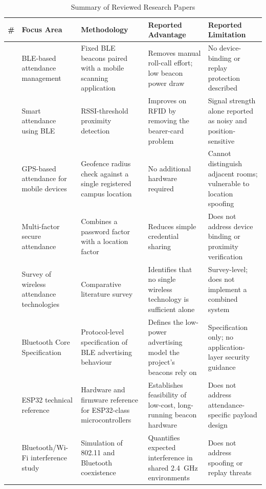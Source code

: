\documentclass[12pt, a4paper, oneside]{report}
\begin{document}
\begin{table}[p]
\centering
\caption{Summary of Reviewed Research Papers}
\label{tab:reviewed-papers}
\tiny
\setlength{\tabcolsep}{3pt}
\renewcommand{\arraystretch}{1.08}
\begin{tabularx}{\textwidth}{|>{\centering\arraybackslash}p{0.55cm}|X|X|X|X|}
\hline
\textbf{\#} & \textbf{Focus Area} & \textbf{Methodology} & \textbf{Reported Advantage} & \textbf{Reported Limitation} \\
\hline
1 & BLE-based attendance management~\cite{ref1} & Fixed BLE beacons paired with a mobile scanning application & Removes manual roll-call effort; low beacon power draw & No device-binding or replay protection described \\
\hline
2 & Smart attendance using BLE~\cite{ref2} & RSSI-threshold proximity detection & Improves on RFID by removing the bearer-card problem & Signal strength alone reported as noisy and position-sensitive \\
\hline
3 & GPS-based attendance for mobile devices~\cite{ref3} & Geofence radius check against a single registered campus location & No additional hardware required & Cannot distinguish adjacent rooms; vulnerable to location spoofing \\
\hline
4 & Multi-factor secure attendance~\cite{ref4} & Combines a password factor with a location factor & Reduces simple credential sharing & Does not address device binding or proximity verification \\
\hline
5 & Survey of wireless attendance technologies~\cite{ref5} & Comparative literature survey & Identifies that no single wireless technology is sufficient alone & Survey-level; does not implement a combined system \\
\hline
6 & Bluetooth Core Specification~\cite{ref6} & Protocol-level specification of BLE advertising behaviour & Defines the low-power advertising model the project's beacons rely on & Specification only; no application-layer security guidance \\
\hline
7 & ESP32 technical reference~\cite{ref7,ref8} & Hardware and firmware reference for ESP32-class microcontrollers & Establishes feasibility of low-cost, long-running beacon hardware & Does not address attendance-specific payload design \\
\hline
8 & Bluetooth/Wi-Fi interference study~\cite{ref9} & Simulation of 802.11 and Bluetooth coexistence & Quantifies expected interference in shared 2.4~GHz environments & Does not address spoofing or replay threats \\

\end{tabularx}
\end{table}
\end{document}
